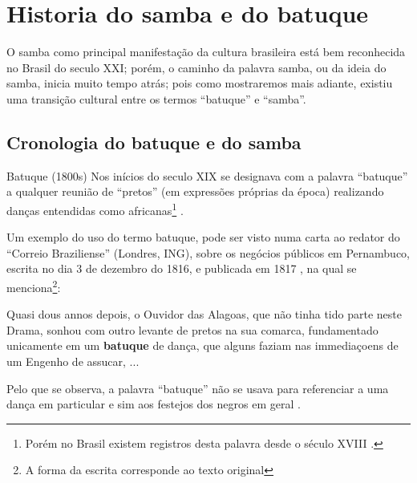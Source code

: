 
\chapter{Historia do samba e do batuque}
O samba como principal manifestação da cultura brasileira está bem reconhecida no Brasil do seculo XXI;
porém, o caminho da palavra samba, ou da ideia do samba, inicia muito tempo atrás;
pois como mostraremos mais adiante, existiu uma transição cultural entre os termos ``batuque'' e ``samba''.


\section{Cronologia do batuque e do samba}

\begin{tcbinformation}{Batuque (1800s)}
\label{ref:batuquedanca1800}
Nos inícios do seculo XIX
se designava com a palavra ``batuque''  a qualquer reunião de ``pretos'' (em expressões próprias da época) realizando danças entendidas como africanas\footnote{
Porém no Brasil existem registros desta palavra desde o século XVIII \cite[pp. 85]{sandroni2001feitico}. }
\cite[pp. 54]{de4danccas} \cite[pp. 73]{lara2007memoria}.
\end{tcbinformation}
Um exemplo do uso do termo batuque, pode ser visto numa carta ao redator do ``Correio Braziliense''  (Londres, ING),
sobre os negócios públicos em Pernambuco,
escrita no dia 3 de dezembro do 1816, e publicada em 1817 \cite[pp. 468]{batuqueBraziliense},
na qual se menciona\footnote{\label{footort}A forma da escrita corresponde ao texto original}:
\begin{citando}%
Quasi dous annos depois, o Ouvidor das Alagoas, que não tinha tido parte neste Drama,
sonhou com outro levante de pretos na sua comarca, 
fundamentado unicamente em um \textbf{batuque} de dança, 
que alguns faziam nas immediaçoens de um Engenho de assucar, ...
\end{citando} 
Pelo que se observa, 
a palavra ``batuque'' não se usava para referenciar a uma dança em particular e sim aos festejos dos negros em geral \cite[pp. 85]{sandroni2001feitico}.\\

